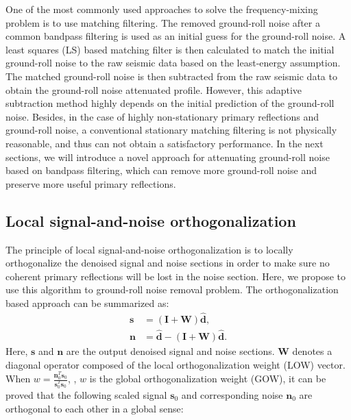 One of the most commonly used approaches to solve the frequency-mixing problem is to use matching filtering. The removed ground-roll noise after a common bandpass filtering is used as an initial guess for the ground-roll noise. A least squares (LS) based matching filter is then calculated to match the initial ground-roll noise to the raw seismic data based on the least-energy assumption. The matched ground-roll noise is then subtracted from the raw seismic data to obtain the ground-roll noise attenuated profile. However, this adaptive subtraction method highly depends on the initial prediction of the ground-roll noise. Besides, in the case of highly non-stationary primary reflections and ground-roll noise, a conventional stationary matching filtering is not physically reasonable, and thus can not obtain a satisfactory performance. In the next sections, we will introduce a novel approach for attenuating ground-roll noise based on bandpass filtering, which can remove more ground-roll noise and preserve more useful primary reflections.

\subsection{Local signal-and-noise orthogonalization}
The principle of local signal-and-noise orthogonalization is to locally orthogonalize the denoised signal and noise sections in order to make sure no coherent primary reflections will be lost in the noise section. %
Here, we propose to use this algorithm to ground-roll noise removal problem. The orthogonalization based approach can be summarized as: 
\begin{align}
\label{eq:news}
\mathbf{s}&=(\mathbf{I}+\mathbf{W})\mathbf{\hat{d}},\\
\label{eq:newn}
\mathbf{n}&=\mathbf{\hat{d}}-(\mathbf{I}+\mathbf{W})\mathbf{\hat{d}}.
\end{align}
Here, $\mathbf{s}$ and $\mathbf{n}$ are the output denoised signal and noise sections. $\mathbf{W}$ denotes a diagonal operator composed of the local orthogonalization weight (LOW) vector.  When $w=\frac{\mathbf{n}_0^T\mathbf{s}_0}{\mathbf{s}_0^T\mathbf{s}_0}$,  , $w$ is the global orthogonalization weight (GOW), it can be proved that the following scaled signal $\mathbf{s}_0$ and corresponding noise $\mathbf{n}_0$ are orthogonal to each other in a global sense: %

